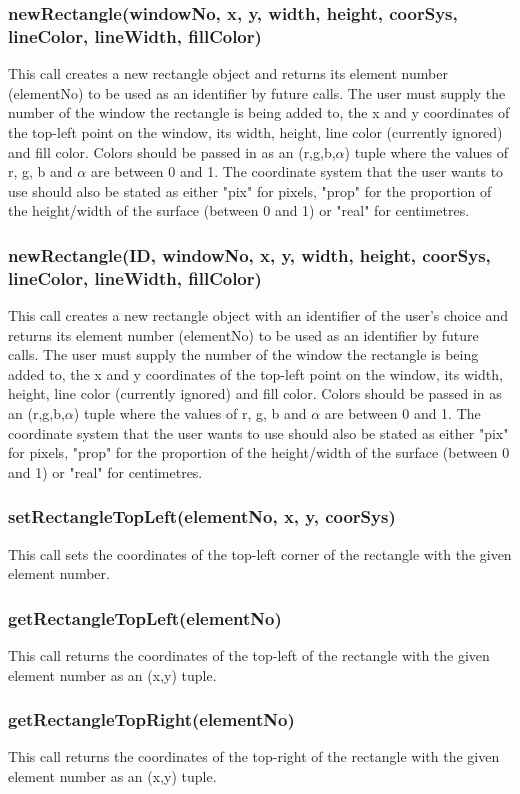 \documentclass{acm_proc_article-sp}
\begin{document}
\subsubsection{newRectangle(windowNo, x, y, width, height, coorSys, lineColor, lineWidth, fillColor)}
This call creates a new rectangle object and returns its element number (elementNo) to be used as an identifier by future calls. The user must supply the number of the window the rectangle is being added to, the x and y coordinates of the top-left point on the window, its width, height, line color (currently ignored) and fill color. Colors should be passed in as an (r,g,b,$\alpha$) tuple where the values of r, g, b and $\alpha$ are between 0 and 1. The coordinate system that the user wants to use should also be stated as either "pix" for pixels, "prop" for the proportion of the height/width of the surface (between 0 and 1) or "real" for centimetres.
\subsubsection{newRectangle(ID, windowNo, x, y, width, height, coorSys, lineColor, lineWidth, fillColor)}
This call creates a new rectangle object with an identifier of the user's choice and returns its element number (elementNo) to be used as an identifier by future calls. The user must supply the number of the window the rectangle is being added to, the x and y coordinates of the top-left point on the window, its width, height, line color (currently ignored) and fill color. Colors should be passed in as an (r,g,b,$\alpha$) tuple where the values of r, g, b and $\alpha$ are between 0 and 1. The coordinate system that the user wants to use should also be stated as either "pix" for pixels, "prop" for the proportion of the height/width of the surface (between 0 and 1) or "real" for centimetres.
\subsubsection{setRectangleTopLeft(elementNo, x, y, coorSys)}
This call sets the coordinates of the top-left corner of the rectangle with the given element number.
\subsubsection{getRectangleTopLeft(elementNo)}
This call returns the coordinates of the top-left of the rectangle with the given element number as an (x,y) tuple.
\subsubsection{getRectangleTopRight(elementNo)}
This call returns the coordinates of the top-right of the rectangle with the given element number as an (x,y) tuple.
\end{document}
